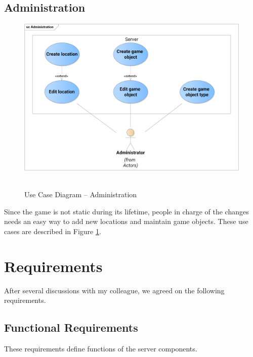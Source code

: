 	\subsection{Administration}
	\begin{figure}[h]	
		\includegraphics[width=\textwidth]{figures/UC_Administration}
		\centering			\
		\caption{Use Case Diagram -- Administration}
		\label{fig:ucadmin}				
	\end{figure}	
	\noindent Since the game is not static during its lifetime, people in charge of the changes needs an easy way to add new locations and maintain game objects. These use cases are described in Figure \ref{fig:ucadmin}.
	
	
\section{Requirements}
\label{section:requirements}
After several discussions with my colleague, we agreed on the following requirements.

	\subsection{Functional Requirements}
	\label{section:fr}
	These requirements define functions of the server components.
